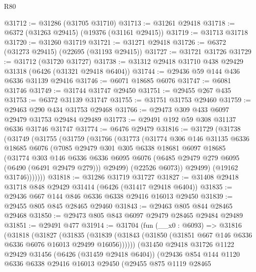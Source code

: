 \begin{lexlean}{R80}
\begin{coremodule}
@31712 := @31286 (@31705 @31710)
@31713 := @31261 @29418
@31718 := @6372 (@31263 @29415) (@19376 (@31161 @29415))
@31719 := @31713 @31718
@31720 := @31260 @31719
@31721 := @31271 @29418
@31726 := @6372 (@31273 @29415) (@22695 (@31193 @29415))
@31727 := @31721 @31726
@31729 := @31712 (@31720 @31727)
@31738 := @31312 @29418 @31710 @438 @29429 @31318 (@6426 (@31321 @29418 @6404))
@31744 := @29436 @59 @144 @436 @6336 @31139 @29416
@31746 := @6071 @18685 @6076
@31747 := @6081 @31746
@31749 := @31744 @31747 @29450
@31751 := @29455 @267 @435
@31753 := @6372 @31139 @31747
@31755 := @31751 @31753 @29460
@31759 := @29463 @290 @434 @31753 @29468
@31766 := @29473 @309 @433 @6097 @29479 @31753 @29484 @29489
@31773 := @29491 @192 @59 @308 @31137 @6336 @31746 @31747
@31774 := @6476 @29479
@31816 := @31729
    (@31738
      (@31749
        (@31755
          (@31759
            (@31766
              (@31773
                (@31774
                  @306
                  @146
                  @31135
                  @6336
                  @18685
                  @6076
                  (@7085
                    @29479
                    @301
                    @305
                    @6338
                    @18681
                    @6097
                    @18685
                    (@31774
                      @303
                      @146
                      @6336
                      @6336
                      @6095
                      @6076
                      (@6485 @29479 @279 @6095 (@6490 (@6491 @29479 @279)))
                      @29499)
                    (@22526 @6073))
                  @29499)
                (@19162 @31746)))))))
@31818 := @31286 @31719 @31727
@31827 := @31408 @29418 @31718 @848 @29429 @31414 (@6426 (@31417 @29418 @6404))
@31835 := @29436 @667 @144 @846 @6336 @6338 @29416 @16013 @29450
@31839 := @29455 @805 @845 @28465 @29460
@31843 := @29463 @805 @844 @28465 @29468
@31850 := @29473 @805 @843 @6097 @29479 @28465 @29484 @29489
@31851 := @29491 @477
@31914 := @31704
    (fun (__x0 : @6093) =>
    @31816
      (@31818
        (@31827
          (@31835
            (@31839 (@31843 (@31850 (@31851 @667 @146 @6336 @6336 @6076 @16013 @29499 @16056))))))
        (@31450
          @29418
          @31726
          @1122
          @29429
          @31456
          (@6426 (@31459 @29418 @6404))
          (@29436
            @854
            @144
            @1120
            @6336
            @6338
            @29416
            @16013
            @29450
            (@29455
              @875
              @1119
              @28465

\end{coremodule}
\end{lexlean}
